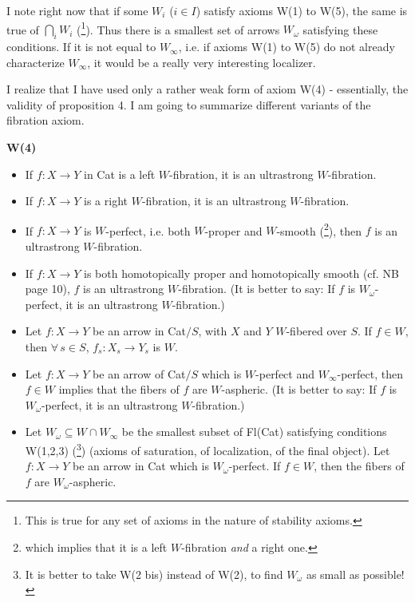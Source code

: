 \documentclass[11pt]{article}
\newcommand{\msp}[1]{\marginpar{\footnotesize [#1]}}
\begin{document}
I note right now that if some $W_i$ ($i \in I$) satisfy axioms W(1) to W(5), the same is true of $\bigcap_i W_i$ (\footnote[30]{This is true for any set of axioms in the nature of stability axioms.}). Thus there is a smallest set of arrows $W_\omega$ satisfying these conditions. If it is not equal to $W_\infty$, i.e. if axioms W(1) to W(5) do not already characterize $W_\infty$, it would be a really very interesting localizer.

I realize that I have used only a rather weak form of axiom W(4) - essentially, the validity of proposition 4. I am going to summarize different variants of the fibration axiom.

\textbf{W(4)}

\begin{itemize}[leftmargin=4em, labelwidth=2.5em, labelsep=0.6em, align=right]
\item[a$_1$)] If $f : X \longrightarrow Y$ in Cat is a left $W$-fibration, it is an ultrastrong $W$-fibration.

\item[a$_2$)] If $f : X \longrightarrow Y$ is a right $W$-fibration, it is an ultrastrong $W$-fibration.

\item[a$'$)] If $f : X \longrightarrow Y$ is $W$-perfect, i.e. both $W$-proper and $W$-smooth (\footnote[31]{which implies that it is a left $W$-fibration \textit{and} a right one.}), then $f$ is an ultrastrong $W$-fibration.

\item[a$''$)] If $f : X \longrightarrow Y$ is both homotopically proper and homotopically smooth (cf. NB page 10), $f$ is an ultrastrong $W$-fibration. (It is better to say: If $f$ is $W_\omega$-perfect, it is an ultrastrong $W$-fibration.)

\item[b)] Let $f : X \longrightarrow Y$ be an arrow in Cat$/S$, with $X$ and $Y$ $W$-fibered over $S$. If $f \in W$, then $\forall\, s \in S$, $f_s : X_s \longrightarrow Y_s$ is $W$.

\item[b$'$)] Let $f : X \longrightarrow Y$ be an arrow of Cat$/S$ which is $W$-perfect and $W_\infty$-perfect, then $f \in W$ implies that the fibers of $f$ are $W$-aspheric. (It is better to say: If $f$ is $W_\omega$-perfect, it is an ultrastrong $W$-fibration.)

\item[b$''$)] \msp{page 14}Let $W_\omega \subseteq W \cap W_\infty$ be the smallest subset of Fl(Cat) satisfying conditions W(1,2,3) (\footnote[32]{It is better to take W(2 bis) instead of W(2), to find $W_\omega$ as small as possible!}) (axioms of saturation, of localization, of the final object). Let $f : X \longrightarrow Y$ be an arrow in Cat which is $W_\omega$-perfect. If $f \in W$, then the fibers of $f$ are $W_\omega$-aspheric.
\end{itemize}
\end{document}
